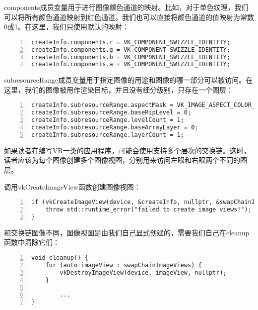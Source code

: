 \documentclass{ctexart}
\begin{document}
components成员变量用于进行图像颜色通道的映射。比如，对于单色纹理，我们可以将所有颜色通道映射到红色通道。我们也可以直接将颜色通道的值映射为常数0或1。在这里，我们只使用默认的映射：

\begin{lstlisting}[language={[ANSI]C},keywordstyle=\color{blue!70},commentstyle=\color{red!50!green!50!blue!50},frame=shadowbox, rulesepcolor=\color{red!20!green!20!blue!20},basicstyle=\small,numbers=left, numberstyle=\tiny,breaklines=true]
createInfo.components.r = VK_COMPONENT_SWIZZLE_IDENTITY;
createInfo.components.g = VK_COMPONENT_SWIZZLE_IDENTITY;
createInfo.components.b = VK_COMPONENT_SWIZZLE_IDENTITY;
createInfo.components.a = VK_COMPONENT_SWIZZLE_IDENTITY;
\end{lstlisting}

subresourceRange成员变量用于指定图像的用途和图像的哪一部分可以被访问。在这里，我们的图像被用作渲染目标，并且没有细分级别，只存在一个图层：

\begin{lstlisting}[language={[ANSI]C},keywordstyle=\color{blue!70},commentstyle=\color{red!50!green!50!blue!50},frame=shadowbox, rulesepcolor=\color{red!20!green!20!blue!20},basicstyle=\small,numbers=left, numberstyle=\tiny,breaklines=true]
createInfo.subresourceRange.aspectMask = VK_IMAGE_ASPECT_COLOR_BIT;
createInfo.subresourceRange.baseMipLevel = 0;
createInfo.subresourceRange.levelCount = 1;
createInfo.subresourceRange.baseArrayLayer = 0;
createInfo.subresourceRange.layerCount = 1;
\end{lstlisting}

如果读者在编写VR一类的应用程序，可能会使用支持多个层次的交换链。这时，读者应该为每个图像创建多个图像视图，分别用来访问左眼和右眼两个不同的图层。

调用vkCreateImageView函数创建图像视图：

\begin{lstlisting}[language={[ANSI]C},keywordstyle=\color{blue!70},commentstyle=\color{red!50!green!50!blue!50},frame=shadowbox, rulesepcolor=\color{red!20!green!20!blue!20},basicstyle=\small,numbers=left, numberstyle=\tiny,breaklines=true]
if (vkCreateImageView(device, &createInfo, nullptr, &swapChainImageViews[i]) != VK_SUCCESS) {
	throw std::runtime_error("failed to create image views!");
}
\end{lstlisting}

和交换链图像不同，图像视图是由我们自己显式创建的，需要我们自己在cleanup函数中清除它们：

\begin{lstlisting}[language={[ANSI]C},keywordstyle=\color{blue!70},commentstyle=\color{red!50!green!50!blue!50},frame=shadowbox, rulesepcolor=\color{red!20!green!20!blue!20},basicstyle=\small,numbers=left, numberstyle=\tiny,breaklines=true]
void cleanup() {
	for (auto imageView : swapChainImageViews) {
		vkDestroyImageView(device, imageView, nullptr);
	}

		...
}
\end{lstlisting}
\end{document}
